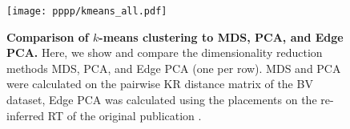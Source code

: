 
\begin{figure}[hpbt]
    \centering
    \texttt{[image: pppp/kmeans\_all.pdf]}
    \begin{subfigure}{0pt}
        \label{fig:kmeans_all:sub:mds_em}
    \end{subfigure}
    \begin{subfigure}{0pt}
        \label{fig:kmeans_all:sub:mds_ei}
    \end{subfigure}
    \begin{subfigure}{0pt}
        \label{fig:kmeans_all:sub:mds_ns}
    \end{subfigure}
    \begin{subfigure}{0pt}
        \label{fig:kmeans_all:sub:pca_em}
    \end{subfigure}
    \begin{subfigure}{0pt}
        \label{fig:kmeans_all:sub:pca_ei}
    \end{subfigure}
    \begin{subfigure}{0pt}
        \label{fig:kmeans_all:sub:pca_ns}
    \end{subfigure}
    \begin{subfigure}{0pt}
        \label{fig:kmeans_all:sub:epca_em}
    \end{subfigure}
    \begin{subfigure}{0pt}
        \label{fig:kmeans_all:sub:epca_ei}
    \end{subfigure}
    \begin{subfigure}{0pt}
        \label{fig:kmeans_all:sub:epca_ns}
    \end{subfigure}
    \caption[Comparison of $k$-means clustering to MDS, PCA, and Edge PCA]{
        \textbf{Comparison of $k$-means clustering to MDS, PCA, and Edge PCA.}
        Here, we show and compare the dimensionality reduction methods MDS, PCA, and Edge PCA (one per row).
        MDS and PCA were calculated on the pairwise KR distance matrix of the \ac{BV} dataset,
        Edge PCA was calculated using the placements
        on the re-inferred \ac{RT} of the original publication \cite{Srinivasan2012}.
}
\end{figure}

